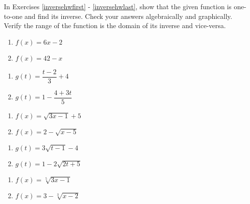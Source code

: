 \documentclass{ximera}
\begin{document}
In Exercises \ref{inversehwfirst} - \ref{inversehwlast}, show that the given function is one-to-one and find its inverse.  Check your answers algebraically and graphically.  Verify the range of the function is the domain of its inverse and vice-versa.

\begin{multicols}{2}
\begin{enumerate}
\setcounter{enumi}{\value{HW}}

\item $f(x) = 6x - 2$ \label{inversehwfirst}
\item $f(x) = 42-x$


\setcounter{HW}{\value{enumi}}
\end{enumerate}
\end{multicols}


\begin{multicols}{2}
\begin{enumerate}
\setcounter{enumi}{\value{HW}}

\item $g(t) = \dfrac{t-2}{3} + 4$
\item $g(t)  = 1 - \dfrac{4+3t}{5}$


\setcounter{HW}{\value{enumi}}
\end{enumerate}
\end{multicols}


\begin{multicols}{2}
\begin{enumerate}
\setcounter{enumi}{\value{HW}}

\item $f(x) = \sqrt{3x-1}+5$
\item $f(x) = 2-\sqrt{x - 5}$

\setcounter{HW}{\value{enumi}}
\end{enumerate}
\end{multicols}

\begin{multicols}{2}
\begin{enumerate}
\setcounter{enumi}{\value{HW}}

\item $g(t) = 3\sqrt{t-1}-4$
\item $g(t) = 1 - 2\sqrt{2t+5}$


\setcounter{HW}{\value{enumi}}
\end{enumerate}
\end{multicols}

\begin{multicols}{2}
\begin{enumerate}
\setcounter{enumi}{\value{HW}}

\item $f(x) = \sqrt[5]{3x-1}$
\item $f(x) = 3-\sqrt[3]{x-2}$

\setcounter{HW}{\value{enumi}}
\end{enumerate}
\end{multicols}
\end{document}
